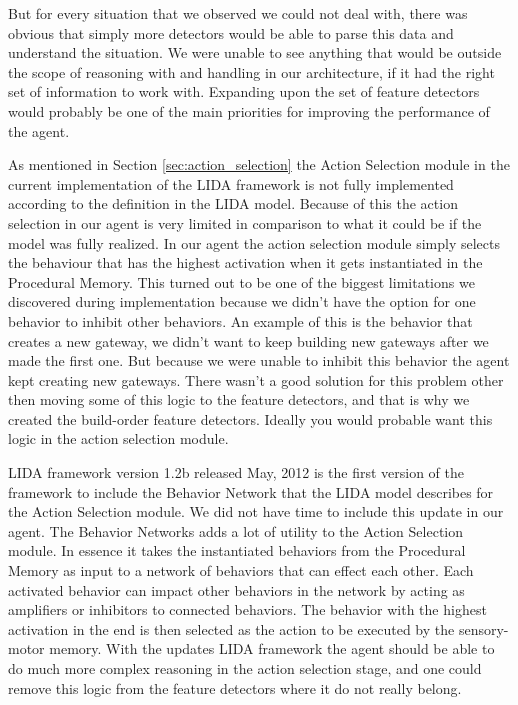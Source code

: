 But for every situation that we observed we could not deal with, there was obvious that simply more detectors would be able to parse this data and understand the situation. We were unable to see anything that would be outside the scope of reasoning with and handling in our architecture, if it had the right set of information to work with. Expanding upon the set of feature detectors would probably be one of the main priorities for improving the performance of the agent.

As mentioned in Section \ref{sec:action_selection} the Action Selection module in the current implementation of the LIDA framework is not fully implemented according to the definition in the LIDA model. Because of this the action selection in our agent is very limited in comparison to what it could be if the model was fully realized. In our agent the action selection module simply selects the behaviour that has the highest activation when it gets instantiated in the Procedural Memory. This turned out to be one of the biggest limitations we discovered during implementation because we didn't have the option for one behavior to inhibit other behaviors. An example of this is the behavior that creates a new gateway, we didn't want to keep building new gateways after we made the first one. But because we were unable to inhibit this behavior the agent kept creating new gateways. There wasn't a good solution for this problem other then moving some of this logic to the feature detectors, and that is why we created the build-order feature detectors. Ideally you would probable want this logic in the action selection module.

LIDA framework version 1.2b released May, 2012 is the first version of the framework to include the Behavior Network that the LIDA model describes for the Action Selection module. We did not have time to include this update in our agent. The Behavior Networks adds a lot of utility to the Action Selection module. In essence it takes the instantiated behaviors from the Procedural Memory as input to a network of behaviors that can effect each other. Each activated behavior can impact other behaviors in the network by acting as amplifiers or inhibitors to connected behaviors. The behavior with the highest activation in the end is then selected as the action to be executed by the sensory-motor memory. With the updates LIDA framework the agent should be able to do much more complex reasoning in the action selection stage, and one could remove this logic from the feature detectors where it do not really belong.


